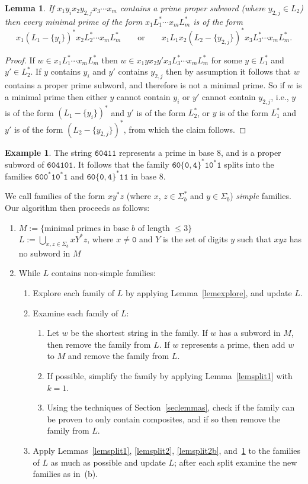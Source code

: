 \documentclass[12pt]{article}
\theoremstyle{plain}
\newtheorem{lemma}[theorem]{Lemma}
\theoremstyle{definition}
\newtheorem{example}[theorem]{Example}
\theoremstyle{remark}
\newcommand{\0}{\mathtt{0}}
\newcommand{\1}{\mathtt{1}}
\newcommand{\2}{\mathtt{2}}
\newcommand{\3}{\mathtt{3}}
\newcommand{\4}{\mathtt{4}}
\newcommand{\5}{\mathtt{5}}
\newcommand{\6}{\mathtt{6}}
\newcommand{\7}{\mathtt{7}}
\newcommand{\8}{\mathtt{8}}
\newcommand{\9}{\mathtt{9}}
\begin{document}
\begin{lemma}\label{lemsplit2c}
If $x_1y_ix_2y_{2,j}x_3\dotsm x_m$ contains a prime proper subword (where $y_{2,j}\in L_2$) then every minimal prime of the form
$x_1L_1^*\dotsm x_mL_m^*$ is of the form
\[x_1(L_1-\{y_i\})^*x_2L_2^*\dotsm x_mL_m^* \qquad\text{or}\qquad x_1L_1x_2(L_2-\{y_{2,j}\})^*x_3L_3^*\dotsm x_mL_m^* . \]
\end{lemma}
\begin{proof}
If $w\in x_1L_1^*\dotsm x_mL_m^*$ then $w\in x_1yx_2y'x_3L_3^*\dotsm x_mL_m^*$ for some $y\in L_1^*$ and $y'\in L_2^*$.
If $y$ contains $y_i$ and $y'$ contains $y_{2,j}$ then by assumption it follows that $w$ contains a proper prime subword,
and therefore is not a minimal prime.  So if $w$ is a minimal prime then either $y$ cannot contain $y_i$ or $y'$ cannot
contain $y_{2,j}$, i.e., $y$ is of the form $(L_1-\{y_i\})^*$ and $y'$ is of the form $L_2^*$, or $y$ is of the form
$L_1^*$ and $y'$ is of the form $(L_2-\{y_{2,j}\})^*$, from which the claim follows.
\end{proof}
\begin{example}
The string $\6\0\4\1\1$ represents a prime in base 8, and is a proper subword of $\6\0\4\1\0\1$.
It follows that the family $\6\0\{\0,\4\}^*\1\0^*\1$ splits into the families
$\6\0\0^*\1\0^*\1$ and $\6\0\{\0,\4\}^*\1\1$ in base 8.
\end{example}

We call families of the form $xy^*z$ (where $x$, $z\in\Sigma_b^*$ and $y\in\Sigma_b$) \emph{simple} families.
Our algorithm then proceeds as follows:
\begin{enumerate}
\item $M:=\{\text{minimal primes in base $b$ of length $\leq3$}\}$ \\
$L:=\bigcup_{x,z\in\Sigma_b}xY^*z$, where $x\neq\0$ and $Y$ is the set of digits $y$ such that $xyz$ has no subword in $M$
\item While $L$ contains non-simple families:
\begin{enumerate}
\item Explore each family of $L$ by applying Lemma~\ref{lemexplore}, and update $L$.
\item Examine each family of $L$:
\begin{enumerate}
\item Let $w$ be the shortest string in the family.  If $w$ has a subword in $M$, then remove the family from $L$.
If $w$ represents a prime, then add $w$ to $M$ and remove the family from $L$.
\item If possible, simplify the family by applying Lemma~\ref{lemsplit1} with $k=1$.
\item Using the techniques of Section~\ref{seclemmas}, check if the family can be proven to only contain
composites, and if so then remove the family from $L$.
\end{enumerate}
\item Apply Lemmas~\ref{lemsplit1}, \ref{lemsplit2}, \ref{lemsplit2b}, and~\ref{lemsplit2c} to the families of $L$ as much
as possible and update $L$; after each split examine the new families as in~(b).
\end{enumerate}
\end{enumerate}
\end{document}
